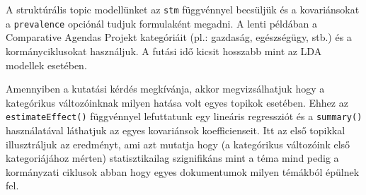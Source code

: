 \documentclass[
]{book}
\newenvironment{Shaded}{\begin{snugshade}}{\end{snugshade}}
\newcommand{\AttributeTok}[1]{\textcolor[rgb]{0.77,0.63,0.00}{#1}}
\newcommand{\ConstantTok}[1]{\textcolor[rgb]{0.00,0.00,0.00}{#1}}
\newcommand{\DecValTok}[1]{\textcolor[rgb]{0.00,0.00,0.81}{#1}}
\newcommand{\FunctionTok}[1]{\textcolor[rgb]{0.00,0.00,0.00}{#1}}
\newcommand{\NormalTok}[1]{#1}
\newcommand{\OtherTok}[1]{\textcolor[rgb]{0.56,0.35,0.01}{#1}}
\newcommand{\SpecialCharTok}[1]{\textcolor[rgb]{0.00,0.00,0.00}{#1}}
\newcommand{\StringTok}[1]{\textcolor[rgb]{0.31,0.60,0.02}{#1}}
\begin{document}
A struktúrális topic modellünket az \texttt{stm} függvénnyel becsüljük
és a kovariánsokat a \texttt{prevalence} opciónál tudjuk formulaként
megadni. A lenti példában a Comparative Agendas Projekt kategóriáit
(pl.: gazdaság, egészségügy, stb.) és a kormányciklusokat használjuk. A
futási idő kicsit hosszabb mint az LDA modellek esetében.

\begin{Shaded}
\end{Shaded}

Amennyiben a kutatási kérdés megkívánja, akkor megvizsálhatjuk hogy a
kategórikus változóinknak milyen hatása volt egyes topikok esetében.
Ehhez az \texttt{estimateEffect()} függvénnyel lefuttatunk egy lineáris
regressziót és a \texttt{summary()} használatával láthatjuk az egyes
kovariánsok koefficienseit. Itt az első topikkal illusztráljuk az
eredményt, ami azt mutatja hogy (a kategórikus változóink első
kategoriájához mérten) statisztikailag szignifikáns mint a téma mind
pedig a kormányzati ciklusok abban hogy egyes dokumentumok milyen
témákból épülnek fel.
\end{document}
